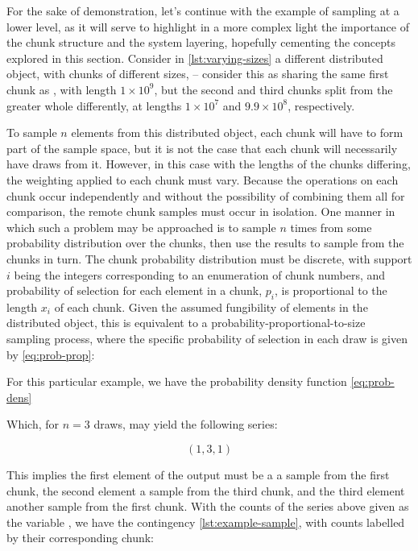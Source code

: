 For the sake of demonstration, let's continue with the example of sampling at a lower level, as it will serve to highlight in a more complex light the importance of the chunk structure and the system layering, hopefully cementing the concepts explored in this section.
Consider in \cref{lst:varying-sizes} a different distributed object, with chunks of different sizes,  -- consider this as sharing the same first chunk as , with length \(1 \times 10^9\), but the second and third chunks split from the greater whole differently, at lengths \(1 \times 10^7\) and \(9.9 \times 10^8\), respectively.


To sample \(n\) elements from this distributed object, each chunk will have to form part of the sample space, but it is not the case that each chunk will necessarily have draws from it.
However, in this case with the lengths of the chunks differing, the weighting applied to each chunk must vary.
Because the operations on each chunk occur independently and without the possibility of combining them all for comparison, the remote chunk samples must occur in isolation.
One manner in which such a problem may be approached is to sample \(n\) times from some probability distribution over the chunks, then use the results to sample from the chunks in turn.
The chunk probability distribution must be discrete, with support \(i\) being the integers corresponding to an enumeration of chunk numbers, and probability of selection for each element in a chunk, \(p_i\), is proportional to the length \(x_i\) of each chunk.
Given the assumed fungibility of elements in the distributed object, this is equivalent to a probability-proportional-to-size sampling process, where the specific probability of selection in each draw is given by \cref{eq:prob-prop}:


For this particular example, we have the probability density function \cref{eq:prob-dens}


Which, for \(n=3\) draws, may yield the following series:

\[ (1, 3, 1) \]

This implies the first element of the output must be a a sample from the first chunk, the second element a sample from the third chunk, and the third element another sample from the first chunk.
With the counts of the series above given as the variable , we have the contingency \cref{lst:example-sample}, with counts labelled by their corresponding chunk:

